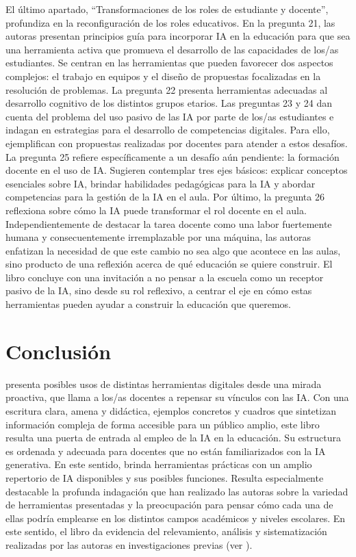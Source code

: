 \documentclass[spanish]{textolivre}
\begin{document}
El último apartado, “Transformaciones de los roles de estudiante y docente”, profundiza en la reconfiguración de los roles educativos. En la pregunta 21, las autoras presentan principios guía para incorporar IA en la educación para que sea una herramienta activa que promueva el desarrollo de las capacidades de los/as estudiantes. Se centran en las herramientas que pueden favorecer dos aspectos complejos: el trabajo en equipos y el diseño de propuestas focalizadas en la resolución de problemas. La pregunta 22 presenta herramientas adecuadas al desarrollo cognitivo de los distintos grupos etarios. Las preguntas 23 y 24 dan cuenta del problema del uso pasivo de las IA por parte de los/as estudiantes e indagan en estrategias para el desarrollo de competencias digitales. Para ello, ejemplifican con propuestas realizadas por docentes para atender a estos desafíos. La pregunta 25 refiere específicamente a un desafío aún pendiente: la formación docente en el uso de IA. Sugieren contemplar tres ejes básicos: explicar conceptos esenciales sobre IA, brindar habilidades pedagógicas para la IA y abordar competencias para la gestión de la IA en el aula. Por último, la pregunta 26 reflexiona sobre cómo la IA puede transformar el rol docente en el aula. Independientemente de destacar la tarea docente como una labor fuertemente humana y consecuentemente irremplazable por una máquina, las autoras enfatizan la necesidad de que este cambio no sea algo que acontece en las aulas, sino producto de una reflexión acerca de qué educación se quiere construir. El libro concluye con una invitación a no pensar a la escuela como un receptor pasivo de la IA, sino desde su rol reflexivo, a centrar el eje en cómo estas herramientas pueden ayudar a construir la educación que queremos.

\section{Conclusión}\label{sec-conduta}
 presenta posibles usos de distintas herramientas digitales desde una mirada proactiva, que llama a los/as docentes a repensar su vínculos con las IA. Con una escritura clara, amena y didáctica, ejemplos concretos y cuadros que sintetizan información compleja de forma accesible para un público amplio, este libro resulta una puerta de entrada al empleo de la IA en la educación. Su estructura es ordenada y adecuada para docentes que no están familiarizados con la IA generativa. En este sentido, brinda herramientas prácticas con un amplio repertorio de IA disponibles y sus posibles funciones. Resulta especialmente destacable la profunda indagación que han realizado las autoras sobre la variedad de herramientas presentadas y la preocupación para pensar cómo cada una de ellas podría emplearse en los distintos campos académicos y niveles escolares. En este sentido, el libro da evidencia del relevamiento, análisis y sistematización realizadas por las autoras en investigaciones previas (ver \textcite{moran2025analisis}). 
\end{document}
